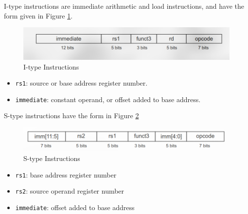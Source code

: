 I-type instructions are immediate arithmetic
and load instructions, and have the form given
in Figure \ref{fig:itype}.
\begin{figure}
    \includegraphics{images/itype.png}
    \caption{I-type Instructions}
    \label{fig:itype}
\end{figure}
\begin{itemize}
    \item \texttt{rs1}: source or base address register number.
    \item \texttt{immediate}: constant operand, or offset added to base address.
\end{itemize}

S-type instructions have the form in
Figure \ref{fig:stype}
\begin{figure}
    \includegraphics{images/stype.png}
    \caption{S-type Instructions}
    \label{fig:stype}
\end{figure}
\begin{itemize}
    \item \texttt{rs1}: base address register number
    \item \texttt{rs2}: source operand register number
    \item \texttt{immediate}: offset added to base address
\end{itemize}


